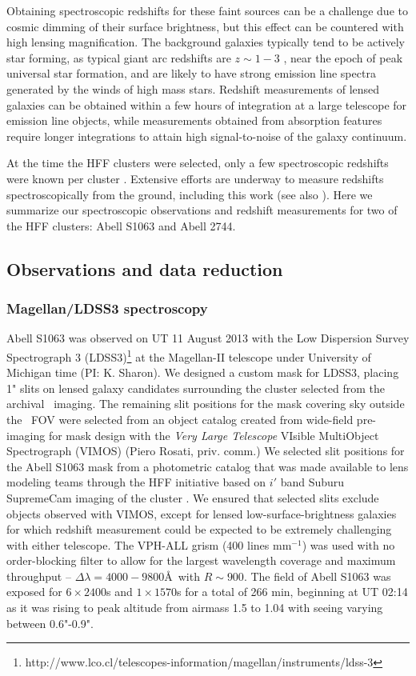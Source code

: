 Obtaining spectroscopic redshifts for these faint sources can be a challenge due to cosmic dimming of their surface brightness, but this effect can be countered with high lensing magnification. The background galaxies typically tend to be actively star forming, as  typical giant arc redshifts are $z\sim1-3$ \citep{Bayliss:2012rt,Bayliss:2011gf,Livermore:2012fk}, near the epoch of peak universal star formation, and are likely to have strong emission line spectra generated by the winds of high mass stars. Redshift measurements of lensed galaxies can be obtained within a few hours of integration at a large telescope for emission line objects, while measurements obtained from absorption features require longer integrations to attain high signal-to-noise of the galaxy continuum.

At the time the HFF clusters were selected, only a few spectroscopic redshifts were known per cluster \citep{Zitrin:2013lr,Limousin:2012fj,Smith:2009lr,Richard:2010wd}. Extensive efforts are underway to measure redshifts spectroscopically from the ground, including this work (see also \citealt{Richard:2014gf,Monna:2014lr}). Here we summarize our spectroscopic observations and redshift measurements for two of the HFF clusters: Abell S1063 and Abell 2744.

\subsection{Observations and data reduction}

\subsubsection{Magellan/LDSS3 spectroscopy}
Abell S1063 was observed on UT 11 August 2013 with the Low Dispersion Survey Spectrograph 3 (LDSS3)\footnote{http://www.lco.cl/telescopes-information/magellan/instruments/ldss-3} at the Magellan-II telescope under University of Michigan time (PI: K. Sharon). We designed a custom mask for LDSS3, placing 1" slits on lensed galaxy candidates surrounding the cluster selected from the archival \hst\ imaging. The remaining slit positions for the mask covering sky outside the \hst\ FOV were selected from an object catalog created from wide-field pre-imaging for mask design with the \emph{Very Large Telescope} VIsible MultiObject Spectrograph (VIMOS) (Piero Rosati, priv. comm.) We selected slit positions for the Abell S1063 mask from a photometric catalog that was made available to lens modeling teams through the HFF initiative based on $i'$ band Suburu SupremeCam imaging of the cluster \citep{Merten:2011fk}. We ensured that selected slits exclude objects observed with VIMOS, except for lensed low-surface-brightness galaxies for which redshift measurement could be expected to be extremely challenging with either telescope. The VPH-ALL grism (400 lines $\mathrm{mm^{-1}}$) was used with no order-blocking filter to allow for the largest wavelength coverage and maximum throughput -- $\Delta\lambda=4000-9800$\AA\ with $R\sim900$. The field of Abell S1063 was exposed for $6\times2400$s and $1\times1570$s for a total of 266 min, beginning at UT 02:14 as it was rising to peak altitude from airmass 1.5 to 1.04 with seeing varying between 0.6"-0.9".

